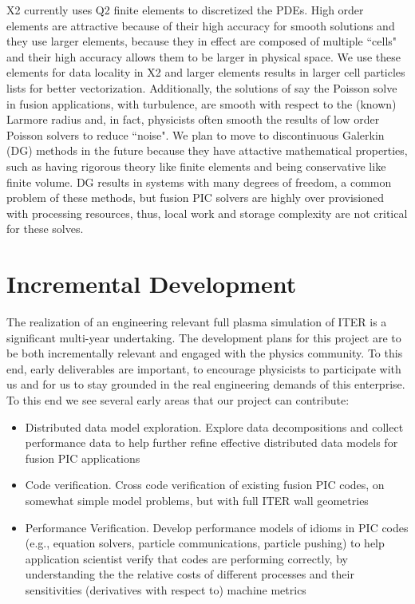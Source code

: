 \documentclass[review]{siamart}
\begin{document}
X2 currently uses Q2 finite elements to discretized the PDEs.
High order elements are attractive because of their high accuracy for smooth solutions and they use larger elements, because they in effect are composed of multiple ``cells" and their high accuracy allows them to be larger in physical space.
We use these elements for data locality in X2 and larger elements results in larger cell particles lists for better vectorization.
Additionally, the solutions of say the Poisson solve in fusion applications, with turbulence, are smooth with respect to the (known) Larmore radius and, in fact, physicists often smooth the results of low order Poisson solvers to reduce ``noise".
We plan to move to discontinuous Galerkin (DG) methods in the future because they have attactive mathematical properties, such as having rigorous theory like finite elements and being conservative like finite volume.
DG results in systems with many degrees of freedom, a common problem of these methods, but fusion PIC solvers are highly over provisioned with processing resources, thus, local work and storage complexity are not critical for these solves.

\section{Incremental Development}

The realization of an engineering relevant full plasma simulation of ITER is a significant multi-year undertaking.
The development plans for this project are to be both incrementally relevant and engaged with the physics community.
To this end, early deliverables are important, to encourage physicists to participate with us and for us to stay grounded in the real engineering demands of this enterprise.
To this end we see several early areas that our project can contribute:
\begin{itemize}
\item Distributed data model exploration. Explore data decompositions and collect performance data to help further refine effective distributed data models for fusion PIC applications
\item Code verification. Cross code verification of existing fusion PIC codes, on somewhat simple model problems, but with full ITER wall geometries
\item Performance Verification.  Develop performance models of idioms in PIC codes (e.g., equation solvers, particle communications, particle pushing) to help application scientist verify that codes are performing correctly, by understanding the the relative costs of different processes and their sensitivities (derivatives with respect to) machine metrics
\end{itemize}
 




 
\end{document}
